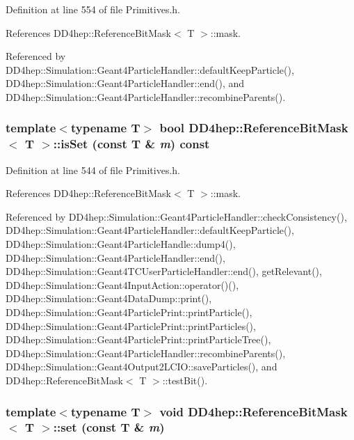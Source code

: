 Definition at line 554 of file Primitives.h.

References DD4hep::ReferenceBitMask$<$ T $>$::mask.

Referenced by DD4hep::Simulation::Geant4ParticleHandler::defaultKeepParticle(), DD4hep::Simulation::Geant4ParticleHandler::end(), and DD4hep::Simulation::Geant4ParticleHandler::recombineParents().\hypertarget{class_d_d4hep_1_1_reference_bit_mask_a18afb2f2dcd2b719f7251546dbbb51b1}{
\subsubsection[{isSet}]{\setlength{\rightskip}{0pt plus 5cm}template$<$typename T$>$ bool {\bf DD4hep::ReferenceBitMask}$<$ T $>$::isSet (const T \& {\em m}) const}}
\label{class_d_d4hep_1_1_reference_bit_mask_a18afb2f2dcd2b719f7251546dbbb51b1}


Definition at line 544 of file Primitives.h.

References DD4hep::ReferenceBitMask$<$ T $>$::mask.

Referenced by DD4hep::Simulation::Geant4ParticleHandler::checkConsistency(), DD4hep::Simulation::Geant4ParticleHandler::defaultKeepParticle(), DD4hep::Simulation::Geant4ParticleHandle::dump4(), DD4hep::Simulation::Geant4ParticleHandler::end(), DD4hep::Simulation::Geant4TCUserParticleHandler::end(), getRelevant(), DD4hep::Simulation::Geant4InputAction::operator()(), DD4hep::Simulation::Geant4DataDump::print(), DD4hep::Simulation::Geant4ParticlePrint::printParticle(), DD4hep::Simulation::Geant4ParticlePrint::printParticles(), DD4hep::Simulation::Geant4ParticlePrint::printParticleTree(), DD4hep::Simulation::Geant4ParticleHandler::recombineParents(), DD4hep::Simulation::Geant4Output2LCIO::saveParticles(), and DD4hep::ReferenceBitMask$<$ T $>$::testBit().\hypertarget{class_d_d4hep_1_1_reference_bit_mask_a9b0db38e1812101d6d93e1d00944b745}{
\subsubsection[{set}]{\setlength{\rightskip}{0pt plus 5cm}template$<$typename T$>$ void {\bf DD4hep::ReferenceBitMask}$<$ T $>$::set (const T \& {\em m})}}
\label{class_d_d4hep_1_1_reference_bit_mask_a9b0db38e1812101d6d93e1d00944b745}


